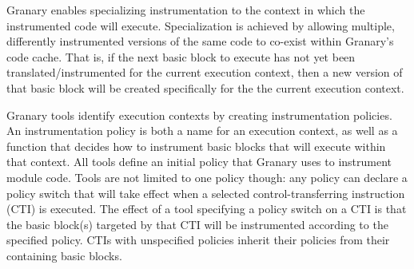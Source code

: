 \documentclass[preprint]{sigplanconf}
\begin{document}


Granary enables specializing instrumentation to the context in which the instrumented code will execute. Specialization is achieved by allowing multiple, differently instrumented versions of the same code to co-exist within Granary's code cache. That is, if the next basic block to execute has not yet been translated/instrumented for the current execution context, then a new version of that basic block will be created  specifically for the the current execution context.




Granary tools identify execution contexts by creating instrumentation policies. An instrumentation policy is both a name for an execution context, as well as a function that decides how to instrument basic blocks that will execute within that context. All tools define an initial policy that Granary uses to instrument module code. Tools are not limited to one policy though: any policy can declare a policy switch that will take effect when a selected control-transferring instruction (CTI) is executed. The effect of a tool specifying a policy switch on a CTI is that the basic block(s) targeted by that CTI will be instrumented according to the specified policy. CTIs with unspecified policies inherit their policies from their containing basic blocks.
\end{document}
